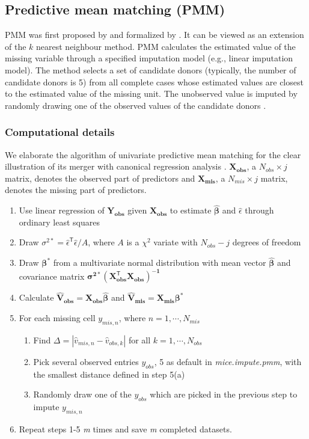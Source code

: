 	\subsection{Predictive mean matching (PMM)}
	PMM was first proposed by \citet{rubin1986statistical} and formalized by \citet{little1988missing}. It can be viewed as an extension of the $k$ nearest neighbour method. PMM calculates the estimated value of the missing variable through a specified imputation model (e.g., linear imputation model). The method selects a set of candidate donors (typically, the number of candidate donors is 5) from all complete cases whose estimated values are closest to the estimated value of the missing unit. The unobserved value is imputed by randomly drawing one of the observed values of the candidate donors \citep{Buuren2018}.
	
	\subsubsection{Computational details}
	We elaborate the algorithm of univariate predictive mean matching for the clear illustration of its merger with canonical regression analysis \citep{Vink2015}. $\boldsymbol{X_{obs}}$, a $N_{obs} \times j$ matrix, denotes the observed part of predictors and $\boldsymbol{X_{mis}}$, a $N_{mis} \times j$ matrix, denotes the missing part of predictors. 
	\begin{enumerate}
		\item Use linear regression of $\boldsymbol{Y_{obs}}$ given $\boldsymbol{X_{obs}}$ to estimate $\boldsymbol{\hat{\beta}}$ and $\hat{\epsilon}$ through ordinary least squares
		\item Draw $\sigma^{2\ast}=\hat{\epsilon}^\mathsf{T}\hat{\epsilon}/A$, where $A$ is a $\chi^2$ variate with $N_{obs}-j$ degrees of freedom
		\item Draw $\boldsymbol{\beta^{\ast}}$ from a multivariate normal distribution with mean vector $\boldsymbol{\hat{\beta}}$ and covariance matrix $\boldsymbol{\sigma^{2\ast}(X^\mathsf{T}_{obs}X_{obs})^{-1}}$
		\item Calculate $\boldsymbol{\hat{V}_{obs}=X_{obs}\hat{\beta}}$ and $\boldsymbol{\hat{V}_{mis}=X_{mis}\beta^{\ast}}$
		\item For each missing cell $y_{mis,n}$, where $n=1,\cdots,N_{mis}$
		\begin{enumerate}
			\item Find $\Delta=|\hat{v}_{mis,n}-\hat{v}_{obs,k}|$ for all $k=1,\cdots,N_{obs}$
			\item Pick several observed entries $y_{obs}$, 5 as default in \emph{mice.impute.pmm}, with the smallest distance defined in step 5(a)
			\item Randomly draw one of the $y_{obs}$ which are picked in the previous step to impute $y_{mis,n}$  
		\end{enumerate}
		\item Repeat steps 1-5 \emph{m} times and save \emph{m} completed datasets. 
	\end{enumerate}
	

